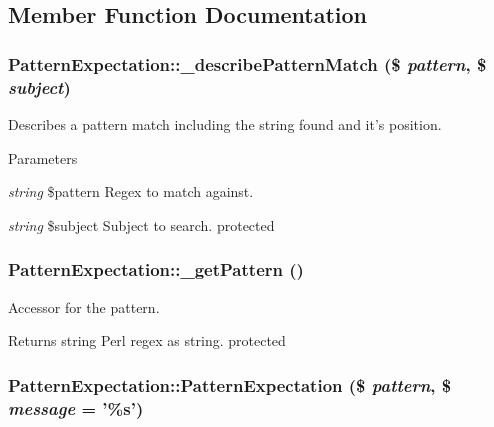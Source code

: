 \subsection{Member Function Documentation}
\hypertarget{class_pattern_expectation_a9a6c6de1a8d1fccb816177426d5f5bda}{
\subsubsection[{\_\-describePatternMatch}]{\setlength{\rightskip}{0pt plus 5cm}PatternExpectation::\_\-describePatternMatch (\$ {\em pattern}, \/  \$ {\em subject})}}
\label{class_pattern_expectation_a9a6c6de1a8d1fccb816177426d5f5bda}
Describes a pattern match including the string found and it's position. 
\begin{DoxyParams}{Parameters}
\item[{\em string}]\$pattern Regex to match against. \item[{\em string}]\$subject Subject to search.  protected \end{DoxyParams}
\hypertarget{class_pattern_expectation_a6f9695a6350b86f418a42e0252f0e59e}{
\subsubsection[{\_\-getPattern}]{\setlength{\rightskip}{0pt plus 5cm}PatternExpectation::\_\-getPattern ()}}
\label{class_pattern_expectation_a6f9695a6350b86f418a42e0252f0e59e}
Accessor for the pattern. \begin{DoxyReturn}{Returns}
string Perl regex as string.  protected 
\end{DoxyReturn}
\hypertarget{class_pattern_expectation_a870ee69338895ba6f682be2f9889427a}{
\subsubsection[{PatternExpectation}]{\setlength{\rightskip}{0pt plus 5cm}PatternExpectation::PatternExpectation (\$ {\em pattern}, \/  \$ {\em message} = {\ttfamily '\%s'})}}

